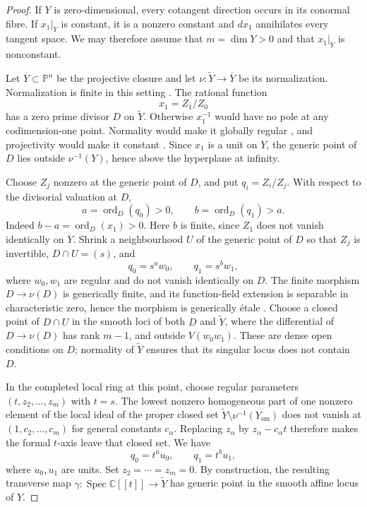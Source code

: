 \documentclass[11pt]{amsart}
\theoremstyle{definition}
\begin{document}
\begin{proof}
If $Y$ is zero-dimensional, every cotangent direction occurs in its conormal
fibre. If $x_1|_Y$ is constant, it is a nonzero constant and $dx_1$ annihilates
every tangent space. We may therefore assume that $m=\dim Y>0$ and that
$x_1|_Y$ is nonconstant.

Let $\overline Y\subset\mathbb P^n$ be the projective closure and let
$\nu:\widetilde Y\to\overline Y$ be its normalization. Normalization is
finite in this setting \cite[Tag 0BXQ, Lemma~33.27.1]{Stacks}. The rational
function
\[
 x_1=Z_1/Z_0
\]
has a zero prime divisor $D$ on $\widetilde Y$. Otherwise $x_1^{-1}$ would
have no pole at any codimension-one point. Normality would make it globally
regular \cite[Tag 031T]{Stacks}, and projectivity would make it constant
\cite[Tag 04L0, Lemma~33.26.2]{Stacks}. Since $x_1$ is a unit on $Y$, the generic point
of $D$ lies outside $\nu^{-1}(Y)$, hence above the hyperplane at infinity.

Choose $Z_j$ nonzero at the generic point of $D$, and put
$q_i=Z_i/Z_j$. With respect to the divisorial valuation at $D$,
\[
 a=\operatorname{ord}_D(q_0)>0,\qquad
 b=\operatorname{ord}_D(q_1)>a.
\tag{4.1}\label{eq:ab}
\]
Indeed $b-a=\operatorname{ord}_D(x_1)>0$. Here $b$ is finite, since $Z_1$
does not vanish identically on $\overline Y$.
Shrink a neighbourhood $U$ of the generic point of $D$ so that $Z_j$ is
invertible, $D\cap U=(s)$, and
\[
 q_0=s^aw_0,\qquad q_1=s^bw_1,
\]
where $w_0,w_1$ are regular and do not vanish identically on $D$. The finite
morphism $D\to\nu(D)$ is generically finite, and its function-field extension
is separable in characteristic zero, hence the morphism is generically
\'{e}tale \cite[Tags 0322 and 07ND]{Stacks}. Choose
a closed point of $D\cap U$ in the smooth loci of both $D$ and
$\widetilde Y$, where the differential of $D\to\nu(D)$ has rank $m-1$, and
outside $V(w_0w_1)$. These are dense open conditions on $D$; normality of
$\widetilde Y$ ensures that its singular locus does not contain $D$.

In the completed local ring at this point, choose regular parameters
$(t,z_2,\ldots,z_m)$ with $t=s$. The lowest nonzero homogeneous part of one
nonzero element of the local ideal of the proper closed set
$\widetilde Y\setminus\nu^{-1}(Y_{\mathrm{sm}})$ does not vanish at
$(1,c_2,\ldots,c_m)$ for general constants $c_\alpha$. Replacing
$z_\alpha$ by $z_\alpha-c_\alpha t$ therefore makes the formal $t$-axis
leave that closed set. We have
\[
 q_0=t^au_0,\qquad q_1=t^bu_1,
 \tag{4.2}\label{eq:q-orders}
\]
where $u_0,u_1$ are units. Set $z_2=\cdots=z_m=0$. By construction, the
resulting transverse map
$\gamma:\operatorname{Spec}\mathbb C[[t]]\to\widetilde Y$ has generic
point in the smooth affine locus of $Y$.


\end{proof}
\end{document}
